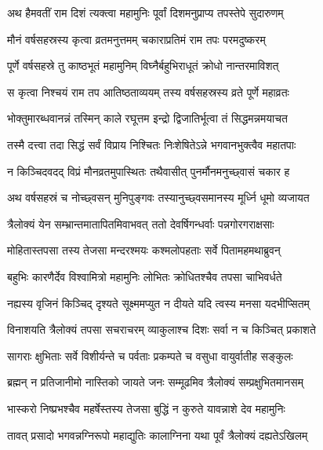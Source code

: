 
\twolineshloka
{अथ हैमवतीं राम दिशं त्यक्त्वा महामुनिः}
{पूर्वां दिशमनुप्राप्य तपस्तेपे सुदारुणम्} %

\twolineshloka
{मौनं वर्षसहस्रस्य कृत्वा व्रतमनुत्तमम्}
{चकाराप्रतिमं राम तपः परमदुष्करम्} %

\twolineshloka
{पूर्णे वर्षसहस्रे तु काष्ठभूतं महामुनिम्}
{विघ्नैर्बहुभिराधूतं क्रोधो नान्तरमाविशत्} %

\twolineshloka
{स कृत्वा निश्चयं राम तप आतिष्ठताव्ययम्}
{तस्य वर्षसहस्रस्य व्रते पूर्णे महाव्रतः} %

\twolineshloka
{भोक्तुमारब्धवानन्नं तस्मिन् काले रघूत्तम}
{इन्द्रो द्विजातिर्भूत्वा तं सिद्धमन्नमयाचत} %

\twolineshloka
{तस्मै दत्त्वा तदा सिद्धं सर्वं विप्राय निश्चितः}
{निःशेषितेऽन्ने भगवानभुक्त्वैव महातपाः} %

\twolineshloka
{न किञ्चिदवदद् विप्रं मौनव्रतमुपास्थितः}
{तथैवासीत् पुनर्मौनमनुच्छ्वासं चकार ह} %

\twolineshloka
{अथ वर्षसहस्रं च नोच्छ्वसन् मुनिपुङ्गवः}
{तस्यानुच्छ्वसमानस्य मूर्ध्नि धूमो व्यजायत} %

\twolineshloka
{त्रैलोक्यं येन सम्भ्रान्तमातापितमिवाभवत्}
{ततो देवर्षिगन्धर्वाः पन्नगोरगराक्षसाः} %

\twolineshloka
{मोहितास्तपसा तस्य तेजसा मन्दरश्मयः}
{कश्मलोपहताः सर्वे पितामहमथाब्रुवन्} %

\twolineshloka
{बहुभिः कारणैर्देव विश्वामित्रो महामुनिः}
{लोभितः क्रोधितश्चैव तपसा चाभिवर्धते} %

\twolineshloka
{नह्यस्य वृजिनं किञ्चिद् दृश्यते सूक्ष्ममप्युत}
{न दीयते यदि त्वस्य मनसा यदभीप्सितम्} %

\twolineshloka
{विनाशयति त्रैलोक्यं तपसा सचराचरम्}
{व्याकुलाश्च दिशः सर्वा न च किञ्चित् प्रकाशते} %

\twolineshloka
{सागराः क्षुभिताः सर्वे विशीर्यन्ते च पर्वताः}
{प्रकम्पते च वसुधा वायुर्वातीह सङ्कुलः} %

\twolineshloka
{ब्रह्मन् न प्रतिजानीमो नास्तिको जायते जनः}
{सम्मूढमिव त्रैलोक्यं सम्प्रक्षुभितमानसम्} %

\twolineshloka
{भास्करो निष्प्रभश्चैव महर्षेस्तस्य तेजसा}
{बुद्धिं न कुरुते यावन्नाशे देव महामुनिः} %

\twolineshloka
{तावत् प्रसादो भगवन्नग्निरूपो महाद्युतिः}
{कालाग्निना यथा पूर्वं त्रैलोक्यं दह्यतेऽखिलम्} %

